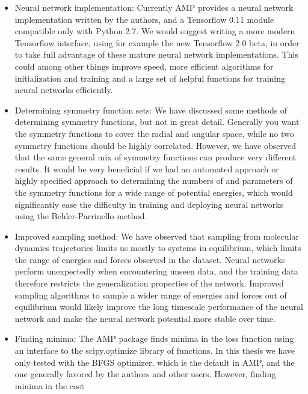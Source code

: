\begin{itemize}
    \item Neural network implementation:
        Currently AMP provides a neural network implementation written
        by the authors, and a Tensorflow 0.11 module compatible only
        with Python 2.7. We would suggest writing a more modern Tensorflow
        interface, using for example the new Tensorflow 2.0 beta,
        in order to take full advantage of these mature neural network
        implementations. This could among other things improve speed,
        more efficient algorithms for initialization and training
        and a large set of helpful functions for training neural networks
        efficiently.
    \item Determining symmetry function sets:
        We have discussed some methods of determining symmetry functions,
        but not in great detail. Generally you want the symmetry functions
        to cover the radial and angular space, while no two symmetry functions
        should be highly correlated. However, we have observed that
        the same general mix of symmetry functions can produce very
        different results. It would be very beneficial if we had an automated
        approach or highly specified approach to determining the numbers of
        and parameters of the symmetry functions for a wide range of
        potential energies, which would significantly ease the difficulty
        in training and deploying neural networks using the Behler-Parrinello
        method.
    \item Improved sampling method:
        We have observed that sampling from molecular dynamics trajectories
        limits us mostly to systems in equilibrium, which limits the
        range of energies and forces observed in the dataset.
        Neural networks perform unexpectedly when encountering unseen data,
        and the training data therefore restricts the generalization
        properties of the network. Improved sampling algorithms to
        sample a wider range of energies and forces out of equilibrium
        would likely improve the long timescale performance of the neural
        network and make the neural network potential more stable over time.
    \item Finding minima:
        The AMP package finds minima in the loss function using an
        interface to the scipy.optimize library of functions.
        In this thesis we have only tested with the BFGS optimizer,
        which is the default in AMP, and the one generally favored
        by the authors and other users. However, finding minima in the cost

\end{itemize}
